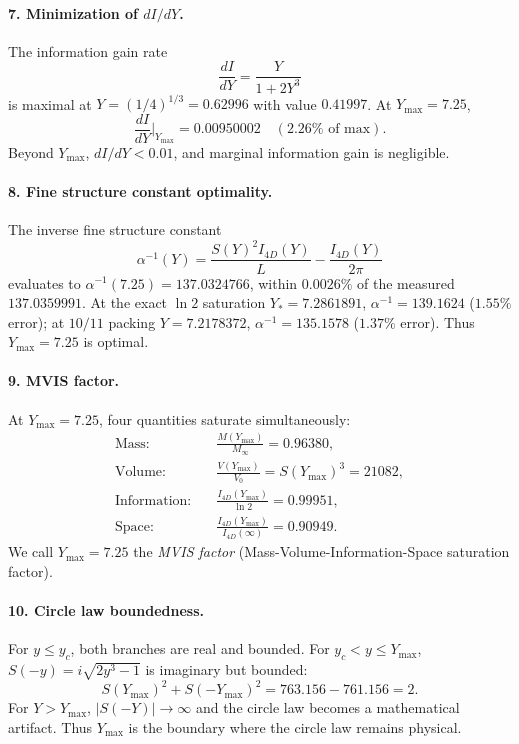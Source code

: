 \documentclass[a4paper,7pt,oneside,openany]{book}
\begin{document}
\paragraph{7. Minimization of \(dI/dY\).} The information gain rate
\begin{equation}
\frac{dI}{dY} = \frac{Y}{1+2Y^3}
\end{equation}
is maximal at \(Y = (1/4)^{1/3} = 0.62996\) with value \(0.41997\). At \(Y_{\max} = 7.25\),
\begin{equation}
\frac{dI}{dY}\bigg|_{Y_{\max}} = 0.00950002 \quad (2.26\%\text{ of max}).
\end{equation}
Beyond \(Y_{\max}\), \(dI/dY < 0.01\), and marginal information gain is negligible.

\paragraph{8. Fine structure constant optimality.} The inverse fine structure constant
\begin{equation}
\alpha^{-1}(Y) = \frac{S(Y)^2 I_{4D}(Y)}{L} - \frac{I_{4D}(Y)}{2\pi}
\end{equation}
evaluates to \(\alpha^{-1}(7.25) = 137.0324766\), within \(0.0026\%\) of the measured \(137.0359991\). At the exact \(\ln 2\) saturation \(Y_* = 7.2861891\), \(\alpha^{-1} = 139.1624\) (\(1.55\%\) error); at \(10/11\) packing \(Y = 7.2178372\), \(\alpha^{-1} = 135.1578\) (\(1.37\%\) error). Thus \(Y_{\max} = 7.25\) is optimal.

\paragraph{9. MVIS factor.} At \(Y_{\max} = 7.25\), four quantities saturate simultaneously:
\begin{align}
\text{Mass:} \quad & \frac{M(Y_{\max})}{M_\infty} = 0.96380, \\
\text{Volume:} \quad & \frac{V(Y_{\max})}{V_0} = S(Y_{\max})^3 = 21082, \\
\text{Information:} \quad & \frac{I_{4D}(Y_{\max})}{\ln 2} = 0.99951, \\
\text{Space:} \quad & \frac{I_{4D}(Y_{\max})}{I_{4D}(\infty)} = 0.90949.
\end{align}
We call \(Y_{\max} = 7.25\) the \emph{MVIS factor} (Mass-Volume-Information-Space saturation factor).

\paragraph{10. Circle law boundedness.} For \(y \leq y_c\), both branches are real and bounded. For \(y_c < y \leq Y_{\max}\), \(S(-y) = i\sqrt{2y^3-1}\) is imaginary but bounded:
\begin{equation}
S(Y_{\max})^2 + S(-Y_{\max})^2 = 763.156 - 761.156 = 2.
\end{equation}
For \(Y > Y_{\max}\), \(|S(-Y)| \to \infty\) and the circle law becomes a mathematical artifact. Thus \(Y_{\max}\) is the boundary where the circle law remains physical.
\end{document}
